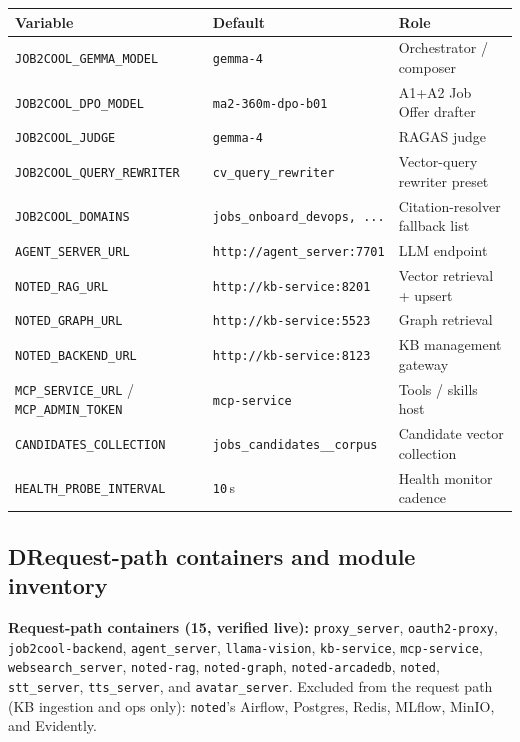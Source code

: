 \begin{table}[h]
\centering
\begin{tabular}{p{5.4cm}p{4.2cm}p{4.4cm}}
\toprule
\textbf{Variable} & \textbf{Default} & \textbf{Role} \\
\midrule
\texttt{JOB2COOL\_GEMMA\_MODEL}    & \texttt{gemma-4}             & Orchestrator / composer \\
\texttt{JOB2COOL\_DPO\_MODEL}      & \texttt{ma2-360m-dpo-b01}    & A1+A2 Job Offer drafter \\
\texttt{JOB2COOL\_JUDGE}           & \texttt{gemma-4}             & RAGAS judge \\
\texttt{JOB2COOL\_QUERY\_REWRITER} & \texttt{cv\_query\_rewriter} & Vector-query rewriter preset \\
\texttt{JOB2COOL\_DOMAINS}         & \texttt{jobs\_onboard\_devops, ...} & Citation-resolver fallback list \\
\texttt{AGENT\_SERVER\_URL}        & \texttt{http://agent\_server:7701} & LLM endpoint \\
\texttt{NOTED\_RAG\_URL}           & \texttt{http://kb-service:8201}    & Vector retrieval + upsert \\
\texttt{NOTED\_GRAPH\_URL}         & \texttt{http://kb-service:5523}    & Graph retrieval \\
\texttt{NOTED\_BACKEND\_URL}       & \texttt{http://kb-service:8123}    & KB management gateway \\
\texttt{MCP\_SERVICE\_URL} / \texttt{MCP\_ADMIN\_TOKEN} & \texttt{mcp-service} & Tools / skills host \\
\texttt{CANDIDATES\_COLLECTION}    & \texttt{jobs\_candidates\_\_corpus} & Candidate vector collection \\
\texttt{HEALTH\_PROBE\_INTERVAL}   & \texttt{10}\,s               & Health monitor cadence \\
\bottomrule
\end{tabular}
\end{table}

\subsection*{D\quad Request-path containers and module inventory}

\textbf{Request-path containers (15, verified live):} \verb|proxy_server|,
\verb|oauth2-proxy|, \verb|job2cool-backend|, \verb|agent_server|, \verb|llama-vision|,
\verb|kb-service|, \verb|mcp-service|, \verb|websearch_server|, \verb|noted-rag|,
\verb|noted-graph|, \verb|noted-arcadedb|, \verb|noted|, \verb|stt_server|,
\verb|tts_server|, and \verb|avatar_server|. Excluded from the request path (KB ingestion
and ops only): \verb|noted|'s Airflow, Postgres, Redis, MLflow, MinIO, and Evidently.

